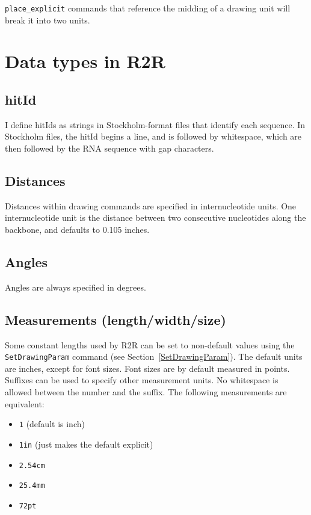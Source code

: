 \documentclass[letterpaper,12pt]{report}
\begin{document}
{\tt place\_explicit} commands that reference the midding of a drawing unit will break it into two units.

\section{Data types in R2R}

\subsection{hitId}
\label{hitId}

I define hitIds as strings in Stockholm-format files that identify each sequence.  In Stockholm files, the hitId begins a line, and is followed by whitespace, which are then followed by the RNA sequence with gap characters.

\subsection{Distances}

Distances within drawing commands are specified in internucleotide units.  One internucleotide unit
is the distance between two consecutive nucleotides along the backbone, and defaults to 0.105 inches.

\subsection{Angles}

Angles are always specified in degrees.

\subsection{Measurements (length/width/size)}
\label{measurements}

Some constant lengths used by R2R can be set to non-default values using the {\tt SetDrawingParam} command (see Section~\ref{SetDrawingParam}). The default units are inches, except for font sizes. Font sizes are by default measured in points.  Suffixes can be used to specify other measurement units.  No whitespace is allowed between the number and the suffix.  The following measurements are equivalent:
\begin{itemize}
\item {\tt 1} (default is inch)
\item {\tt 1in} (just makes the default explicit)
\item {\tt 2.54cm}
\item {\tt 25.4mm}
\item {\tt 72pt}
\end{itemize}
\end{document}
